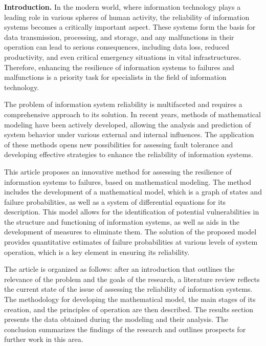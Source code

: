 \begin{multicols}{2}
{\bfseries Introduction.} In the modern world, where information technology
plays a leading role in various spheres of human activity, the
reliability of information systems becomes a critically important
aspect. These systems form the basis for data transmission, processing,
and storage, and any malfunctions in their operation can lead to serious
consequences, including data loss, reduced productivity, and even
critical emergency situations in vital infrastructures. Therefore,
enhancing the resilience of information systems to failures and
malfunctions is a priority task for specialists in the field of
information technology.

The problem of information system reliability is multifaceted and
requires a comprehensive approach to its solution. In recent years,
methods of mathematical modeling have been actively developed, allowing
the analysis and prediction of system behavior under various external
and internal influences. The application of these methods opens new
possibilities for assessing fault tolerance and developing effective
strategies to enhance the reliability of information systems.

This article proposes an innovative method for assessing the resilience
of information systems to failures, based on mathematical modeling. The
method includes the development of a mathematical model, which is a
graph of states and failure probabilities, as well as a system of
differential equations for its description. This model allows for the
identification of potential vulnerabilities in the structure and
functioning of information systems, as well as aids in the development
of measures to eliminate them. The solution of the proposed model
provides quantitative estimates of failure probabilities at various
levels of system operation, which is a key element in ensuring its
reliability.

The article is organized as follows: after an introduction that outlines
the relevance of the problem and the goals of the research, a literature
review reflects the current state of the issue of assessing the
reliability of information systems. The methodology for developing the
mathematical model, the main stages of its creation, and the principles
of operation are then described. The results section presents the data
obtained during the modeling and their analysis. The conclusion
summarizes the findings of the research and outlines prospects for
further work in this area.


\end{multicols}
